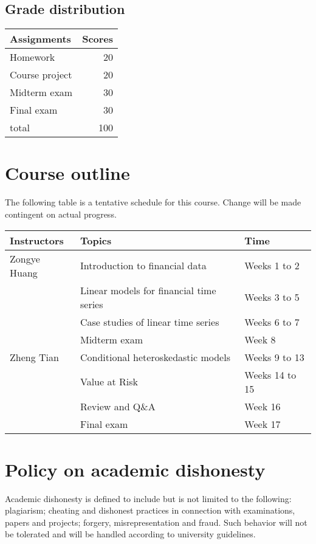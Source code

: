 \documentclass[a4paper,11pt]{article}
\begin{document}
\subsection*{Grade distribution}
\label{sec:org2485e93}

\begin{center}
\begin{tabular}{lr}
Assignments & Scores\\
\hline
Homework & 20\\
Course project & 20\\
Midterm exam & 30\\
Final exam & 30\\
\hline
total & 100\\
\end{tabular}
\end{center}


\section{Course outline}
\label{sec:orgc34e9fd}

The following table is a tentative schedule for this course. Change
will be made contingent on actual progress.

\begin{center}
\begin{tabular}{lll}
Instructors & Topics & Time\\
\hline
Zongye Huang & Introduction to financial data & Weeks 1 to 2\\
 & Linear models for financial time series & Weeks 3 to 5\\
 & Case studies of linear time series & Weeks 6 to 7\\
 & Midterm exam & Week 8\\
\hline
Zheng Tian & Conditional heteroskedastic models & Weeks 9 to 13\\
 & Value at Risk & Weeks 14 to 15\\
 & Review and Q\&A & Week 16\\
\hline
 & Final exam & Week 17\\
\end{tabular}
\end{center}


\section{Policy on academic dishonesty}
\label{sec:org75fce84}

Academic dishonesty is defined to include but is not limited to the
following: plagiarism; cheating and dishonest practices in connection
with examinations, papers and projects; forgery, misrepresentation and
fraud. Such behavior will not be tolerated and will be handled
according to university guidelines.
\end{document}
